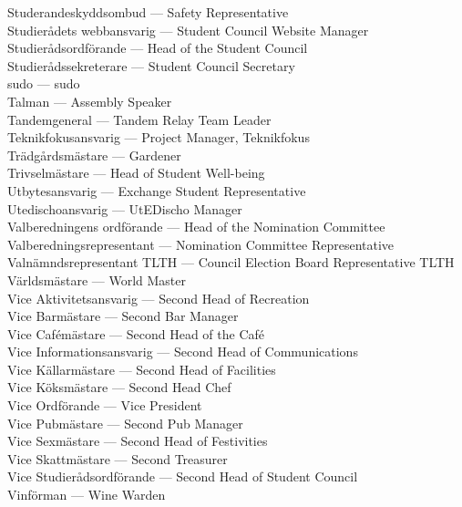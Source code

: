 \documentclass{dsekprotokoll}
\begin{document}
Studerandeskyddsombud ---	Safety Representative\\
Studierådets webbansvarig ---	Student Council Website Manager\\
Studierådsordförande ---	Head of the Student Council\\
Studierådssekreterare ---	Student Council Secretary\\
sudo ---	sudo\\
Talman ---	Assembly Speaker\\
Tandemgeneral ---	Tandem Relay Team Leader\\
Teknikfokusansvarig ---	Project Manager, Teknikfokus\\
Trädgårdsmästare ---	Gardener\\
Trivselmästare ---	Head of Student Well-being\\
Utbytesansvarig ---	Exchange Student Representative\\
Utedischoansvarig ---	UtEDischo Manager\\
Valberedningens ordförande ---	Head of the Nomination Committee\\
Valberedningsrepresentant ---	Nomination Committee Representative\\
Valnämndsrepresentant TLTH ---	Council Election Board Representative TLTH\\
Världsmästare ---	World Master\\
Vice Aktivitetsansvarig --- Second Head of Recreation\\
Vice Barmästare ---	Second Bar Manager\\
Vice Cafémästare ---	Second Head of the Café\\
Vice Informationsansvarig ---	Second Head of Communications\\
Vice Källarmästare ---	Second Head of Facilities\\
Vice Köksmästare ---	Second Head Chef\\
Vice Ordförande ---	Vice President\\
Vice Pubmästare ---	Second Pub Manager\\
Vice Sexmästare ---	Second Head of Festivities\\
Vice Skattmästare ---	Second Treasurer\\
Vice Studierådsordförande ---	Second Head of Student Council\\
Vinförman ---	Wine Warden\\
\end{document}
